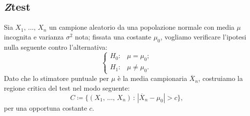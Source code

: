         \subsection{\emph{Z}\nbdash test}
            \begin{defn}[Bilatero]
                Sia $X_1,\, \ldots,\, X_{n}$ un campione aleatorio da una popolazione normale con media $\mu$ 
                incognita e varianza $\sigma^2$ nota; fissata una costante $\mu_0$, vogliamo verificare 
                l'ipotesi nulla seguente contro l'alternativa: \[
                \begin{cases}
                    H_0 : & \mu = \mu_0; \\
                    H_1 : & \mu \neq \mu_0.
                \end{cases}
                \] Dato che lo stimatore puntuale per $\mu$ è la media campionaria $\overline{X}_n$, costruiamo 
                la regione critica del test nel modo seguente: \[
                    C \coloneqq \big\{(X_1,\, \ldots,\, X_{n}) \,:\, |\overline{X}_n -\mu_0| > c\big\}
                ,\] per una opportuna costante $c$.


\end{defn}
